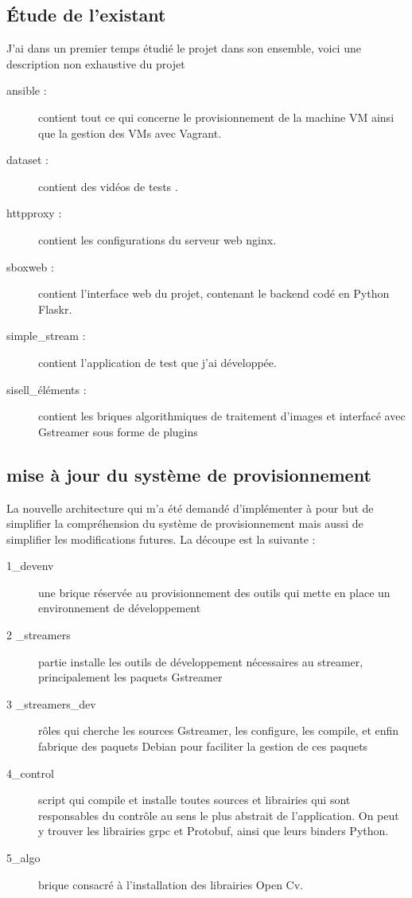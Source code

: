  \subsection{Étude de l'existant}
J'ai dans un premier temps étudié le projet dans son ensemble, voici une description non exhaustive du projet
  \begin{description}
   \item [ansible : ] contient tout ce qui concerne le provisionnement de la machine VM ainsi que la gestion des VMs avec Vagrant.
  \item [dataset : ] contient des vidéos de tests .
  \item [httpproxy : ] contient les configurations du serveur web nginx.
\item [sboxweb : ] contient l'interface web du projet, contenant le backend codé en Python Flaskr.
\item [simple\_stream : ] contient l'application de test que j'ai développée.
\item [sisell\_éléments : ] contient les briques algorithmiques de traitement d'images et interfacé avec Gstreamer sous forme de plugins
  \end{description}

 \subsection{mise à jour du système de provisionnement}
La nouvelle architecture qui m'a été demandé d'implémenter à pour but de simplifier la compréhension du système de provisionnement mais aussi de simplifier les modifications futures. La découpe est la suivante :
  \begin{description}
   \item [1\_devenv] une brique réservée au provisionnement des outils qui mette en place un environnement de développement
   \item [2 \_streamers] partie installe les outils de développement nécessaires au streamer, principalement les paquets Gstreamer
   \item [3 \_streamers\_dev] rôles qui cherche les sources Gstreamer, les configure, les compile, et enfin fabrique des paquets Debian pour faciliter la gestion de ces paquets
   \item [4\_control] script qui compile et installe toutes sources et librairies qui sont responsables du contrôle au sens le plus abstrait de l'application. On peut y trouver les librairies grpc et Protobuf, ainsi que leurs binders Python.
   \item [5\_algo] brique consacré à l'installation des librairies Open Cv.
  \end{description}

